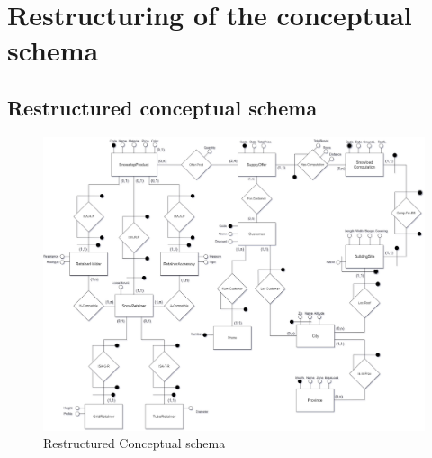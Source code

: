 \documentclass{article}[h]
\begin{document}
\section{Restructuring of the conceptual schema}

\subsection{Restructured conceptual schema}
\begin{figure}[H]\label{RestructuredConceptualSchema}
  \centering
  \includegraphics[scale=0.26, angle=270]{RestructuredConceptualSchema.jpg}
  \caption{Restructured Conceptual schema}
\end{figure}
\end{document}
